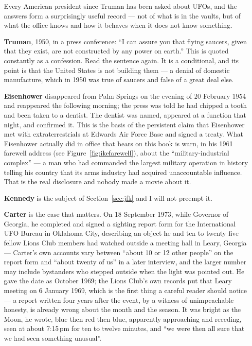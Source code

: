 Every American president since Truman has been asked about UFOs, and the answers form a
surprisingly useful record --- not of what is in the vaults, but of what the office knows and
how it behaves when it does not know something.

\textbf{Truman}, 1950, in a press conference: ``I can assure you that flying saucers, given
that they exist, are not constructed by any power on earth.'' This is quoted constantly as a
confession. Read the sentence again. It is a conditional, and its point is that the United
States is not building them --- a denial of domestic manufacture, which in 1950 was true of
saucers and false of a great deal else.

\textbf{Eisenhower} disappeared from Palm Springs on the evening of 20 February 1954 and
reappeared the following morning; the press was told he had chipped a tooth and been taken to
a dentist. The dentist was named, appeared at a function that night, and confirmed it. This is
the basis of the persistent claim that Eisenhower met with extraterrestrials at Edwards Air
Force Base and signed a treaty. What Eisenhower actually did in office that bears on this book
is warn, in his 1961 farewell address (see Figure~\ref{fig:ikefarewell}), about the ``military-industrial complex'' --- a man who
had commanded the largest military operation in history telling his country that its arms
industry had acquired unaccountable influence. That is the real disclosure and nobody made a
movie about it.

\textbf{Kennedy} is the subject of Section~\ref{sec:jfk} and I will not preempt it.

\textbf{Carter} is the case that matters. On 18 September 1973, while Governor of Georgia, he
completed and signed a sighting report form for the International UFO Bureau in Oklahoma City,
describing an object he and ten to twenty-five fellow Lions Club members had watched outside a
meeting hall in Leary, Georgia --- Carter's own accounts vary between ``about 10 or 12 other
people'' on the report form and ``about twenty of us'' in a later interview, and the larger
number may include bystanders who stepped outside when the light was pointed out. He gave the date as October 1969; the Lions Club's own records
put that Leary meeting on 6 January 1969, which is the first thing a careful reader should
notice --- a report written four years after the event, by a witness of unimpeachable honesty,
is already wrong about the month and the season. It was bright as the Moon, he wrote, blue then
red then blue, apparently approaching and receding, seen at about 7:15\,pm for ten to twelve
minutes, and ``we were then all sure that we had seen something unusual''.

